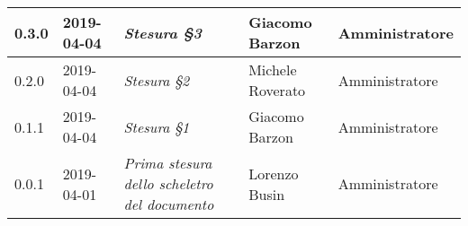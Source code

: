 \begin{longtable}{C{2cm}|C{2.5cm}|C{4.5cm}|C{2.5cm}|C{3cm}}
	0.3.0 & 2019-04-04 & \emph{Stesura §3} & Giacomo Barzon & Amministratore \\
	\hline
	
	0.2.0 & 2019-04-04 & \emph{Stesura §2} & Michele Roverato & Amministratore \\
	\hline
	
	0.1.1 & 2019-04-04 & \emph{Stesura §1} & Giacomo Barzon & Amministratore \\
	\hline
	
	0.0.1 & 2019-04-01 & \emph{Prima stesura dello scheletro del documento} & Lorenzo Busin & Amministratore \\
	
\end{longtable}


\clearpage